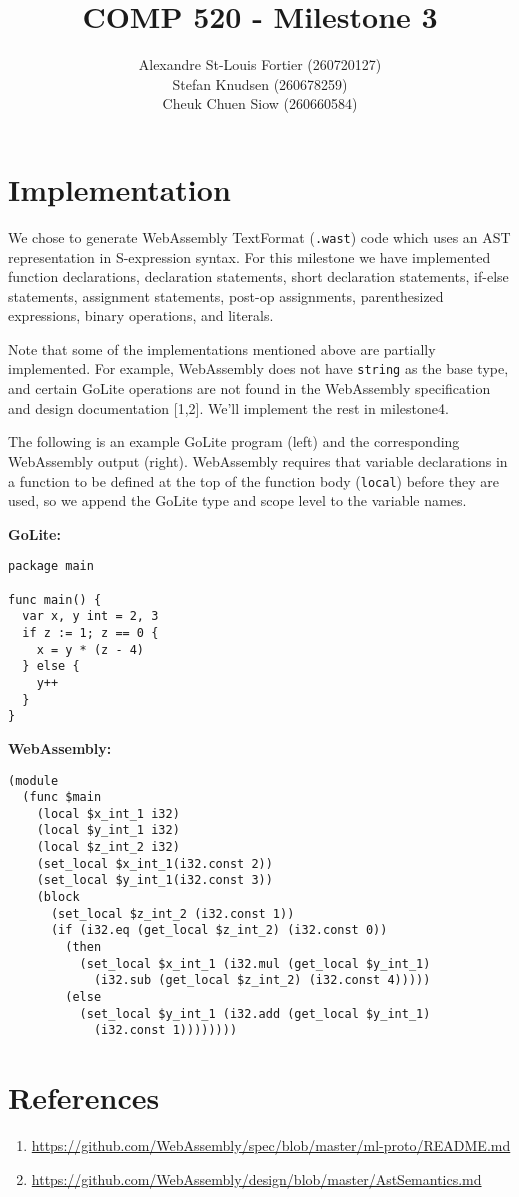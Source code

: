 \documentclass{article}
\begin{document}
\title{COMP 520 - Milestone 3}
\author{
Alexandre St-Louis Fortier (260720127)\\
Stefan Knudsen (260678259)\\
Cheuk Chuen Siow (260660584)}
\maketitle

\raggedright
\section*{Implementation}
We chose to generate WebAssembly TextFormat (\verb|.wast|) code which uses an AST representation in S-expression syntax. For this milestone we have implemented function declarations, declaration statements, short declaration statements, if-else statements, assignment statements, post-op assignments, parenthesized expressions, binary operations, and literals. 

Note that some of the implementations mentioned above are partially implemented. For example, WebAssembly does not have \verb|string| as the base type, and certain GoLite operations are not found in the WebAssembly specification and design documentation [1,2]. We'll implement the rest in milestone4.

The following is an example GoLite program (left) and the corresponding WebAssembly output (right). WebAssembly requires that variable declarations in a function to be defined at the top of the function body (\verb|local|) before they are used, so we append the GoLite type and scope level to the variable names.

\begin{minipage}[t]{0.3\textwidth}
\textbf{GoLite:}
\begin{lstlisting}
package main

func main() {
  var x, y int = 2, 3
  if z := 1; z == 0 {
    x = y * (z - 4)
  } else {
    y++
  }
}
\end{lstlisting}
\end{minipage}
\begin{minipage}[t]{0.6\textwidth}
\textbf{WebAssembly:}
\begin{lstlisting}
(module
  (func $main
    (local $x_int_1 i32)
    (local $y_int_1 i32)
    (local $z_int_2 i32)
    (set_local $x_int_1(i32.const 2))
    (set_local $y_int_1(i32.const 3))
    (block
      (set_local $z_int_2 (i32.const 1))
      (if (i32.eq (get_local $z_int_2) (i32.const 0))
        (then
          (set_local $x_int_1 (i32.mul (get_local $y_int_1) 
            (i32.sub (get_local $z_int_2) (i32.const 4)))))
        (else
          (set_local $y_int_1 (i32.add (get_local $y_int_1) 
            (i32.const 1))))))))
\end{lstlisting}
\end{minipage}

\section*{References}
\begin{enumerate}
	\item \url{https://github.com/WebAssembly/spec/blob/master/ml-proto/README.md}
	\item \url{https://github.com/WebAssembly/design/blob/master/AstSemantics.md}
\end{enumerate}
\end{document}
